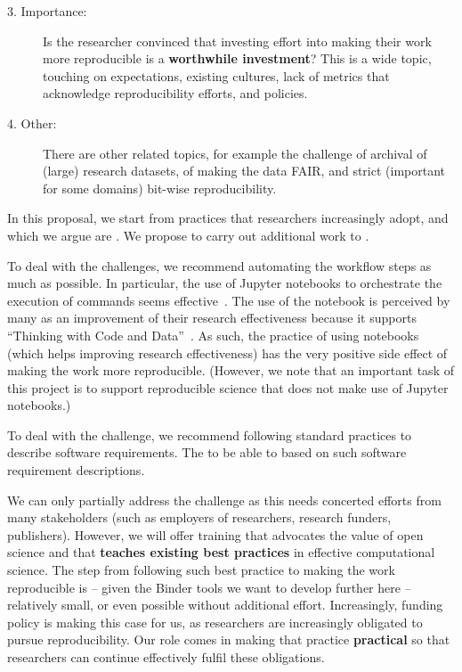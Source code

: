\begin{description}
\item[3. Importance:] Is the researcher convinced that investing effort into making
their work more reproducible is a \textbf{worthwhile investment}? This is a wide topic,
touching on expectations, existing cultures, lack of metrics that acknowledge
reproducibility efforts, and policies.

\item[4. Other:] There are other related topics, for example the challenge of
archival of (large) research datasets, of making the data FAIR, and strict
(important for some domains) bit-wise reproducibility.
\end{description}

In this proposal, we start from practices that researchers increasingly adopt,
and which we argue are . We propose to carry
out additional work to .\medskip

To deal with the  challenges, we recommend automating the
workflow steps as much as possible. In particular, the use of Jupyter notebooks
to orchestrate the execution of commands seems effective~\cite{Beg2021}.
The use of the notebook is
perceived by many as an improvement of their research effectiveness because
it supports ``Thinking with Code and Data''~\cite{Granger2021}. As such, the
practice of using notebooks (which helps improving research effectiveness) has
the very positive side effect of making the work more reproducible. (However, we
note that an important task of this project is to support reproducible science
that does not make use of Jupyter notebooks.)\medskip

To deal with the  challenge, we recommend following
standard practices to describe software requirements. The  to be able to
 based on such software
requirement descriptions.\medskip

We can only partially address the  challenge as this needs
concerted efforts from many stakeholders (such as employers of researchers,
research funders, publishers). However, we will offer training that advocates
the value of open science and that \textbf{teaches existing best practices} in
effective computational science. The step from following such best practice to
making the work reproducible is -- given the Binder tools we want to develop
further here -- relatively small, or even possible without additional effort.
Increasingly, funding policy is making this case for us,
as researchers are increasingly obligated to pursue reproducibility.
Our role comes in making that practice \textbf{practical}
so that researchers can continue effectively fulfil these obligations.\medskip


